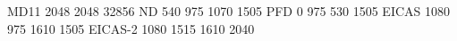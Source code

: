 MD11 2048 2048 32856
ND       540  975 1070 1505
PFD        0  975  530 1505
EICAS   1080  975 1610 1505
EICAS-2 1080 1515 1610  2040
